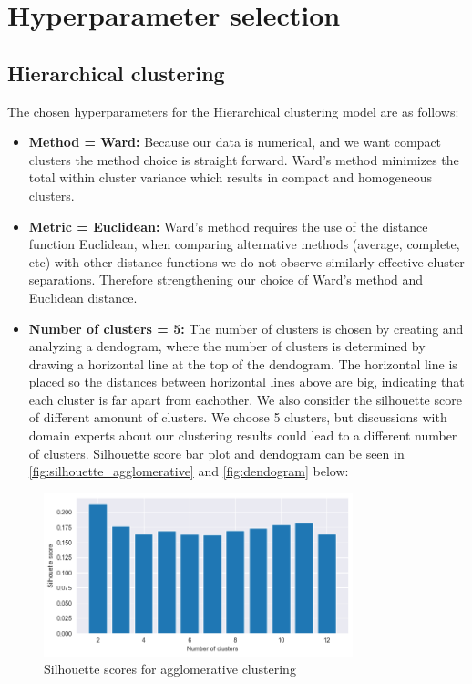 \section{Hyperparameter selection}

\subsection{Hierarchical clustering}

The chosen hyperparameters for the Hierarchical clustering model are as follows:

\begin{itemize}
    \item \textbf{Method = Ward:} Because our data is numerical, and we want compact clusters the method choice is straight forward. Ward's method minimizes the total within cluster variance which results in compact and homogeneous clusters.
    
    \item \textbf{Metric = Euclidean:} Ward's method requires the use of the distance function Euclidean, when comparing alternative methods (average, complete, etc) with other distance functions we do not observe similarly effective cluster separations. Therefore strengthening our choice of Ward's method and Euclidean distance.
    \item \textbf{Number of clusters = 5:} The number of clusters is chosen by creating and analyzing a dendogram, where the number of clusters is determined by drawing a horizontal line at the top of the dendogram. The horizontal line is placed so the distances between horizontal lines above are big, indicating that each cluster is far apart from eachother. We also consider the silhouette score of different amonunt of clusters. We choose 5 clusters, but discussions with domain experts about our clustering results could lead to a different number of clusters. Silhouette score bar plot and dendogram can be seen in \autoref{fig:silhouette_agglomerative} and \autoref{fig:dendogram} below:
\end{itemize}

\begin{figure}[H]
    \centering
    \includegraphics[width=0.8\textwidth]{src/figs/silhouette_agglomerative.png} 
    \caption{Silhouette scores for agglomerative clustering}\label{fig:silhouette_agglomerative}
\end{figure}

